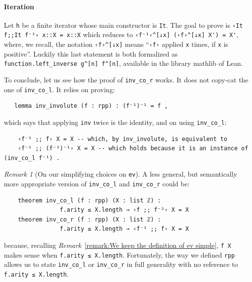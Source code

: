 \documentclass[preprint]{elsarticle}
\theoremstyle{remark}
\newtheorem{remark}{Remark}
\newcommand{\MATHLIB}{\textsf{mathlib}\xspace}
\newcommand{\LEAN}{\textsf{Lean}\xspace}
\begin{document}
\paragraph{Iteration} Let \lstinline|h| be a finite iterator whose main constructor is \lstinline|It|.
The goal to prove is \lstinline|‹It f;;It f⁻¹› x::X = x::X| which reduces to \lstinline|‹f⁻¹›^[↓x] (‹f›^[↓x] X') = X'|, where, we recall, the notation \lstinline|‹f›^[↓x]| means ``\lstinline|‹f›| applied \lstinline|x| times, if \lstinline|x| is positive''. Luckily this last statement is both formalized as \lstinline|function.left_inverse g^[n] f^[n]|, available in the library \MATHLIB of \LEAN.

\vspace{\baselineskip}
To conclude, let us see how the proof of \lstinline|inv_co_r| works. It does not copy-cat the one of \lstinline|inv_co_l|. It relies on proving:
\begin{lstlisting}
   lemma inv_involute (f : rpp) : (f⁻¹)⁻¹ = f ,
\end{lstlisting}
\noindent
which says that applying \lstinline|inv| twice is the identity, and on using \lstinline|inv_co_l|:
\begin{lstlisting}
    ‹f⁻¹ ;; f› X = X -- which, by inv_involute, is equivalent to
    ‹f⁻¹ ;; (f⁻¹)⁻¹› X = X -- which holds because it is an instance of (inv_co_l f⁻¹) .
\end{lstlisting}

\begin{remark}[On our simplifying choices on {\normalfont \lstinline|ev|}]
\label{remark:On our simplifying choices on ev}
A less general, but semantically more appropriate version of  \lstinline|inv_co_l| and \lstinline|inv_co_r| could be:
\begin{lstlisting}
    theorem inv_co_l (f : rpp) (X : list ℤ) :
                f.arity ≤ X.length → ‹f ;; f⁻¹› X = X
    theorem inv_co_r (f : rpp) (X : list ℤ) :
                f.arity ≤ X.length → ‹f⁻¹ ;; f› X = X
\end{lstlisting}
because, recalling \textit{Remark}~\ref{remark:We keep the definition of ev simple}, \lstinline|f X| makes sense when \lstinline|f.arity ≤ X.length|.
Fortunately, the way we defined \lstinline|rpp| allows us to state \lstinline|inv_co_l| or \lstinline|inv_co_r| in full generality
with no reference to \lstinline|f.arity ≤ X.length|.
\end{remark}
\end{document}

